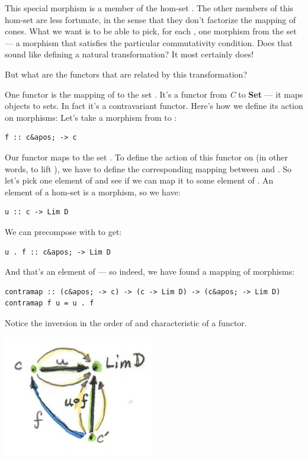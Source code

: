 This special morphism is a member of the hom-set .
The other members of this hom-set are less fortunate, in the sense that
they don't factorize the mapping of cones. What we want is to be able to
pick, for each , one morphism from the set
 --- a morphism that satisfies the particular
commutativity condition. Does that sound like defining a natural
transformation? It most certainly does!

But what are the functors that are related by this transformation?

One functor is the mapping of  to the set
. It's a functor from \emph{C} to \textbf{Set} ---
it maps objects to sets. In fact it's a contravariant functor. Here's
how we define its action on morphisms: Let's take a morphism 
from  to :

\begin{verbatim}
f :: c&apos; -> c
\end{verbatim}

Our functor maps  to the set
. To define the action of this functor on
 (in other words, to lift ), we have to define the
corresponding mapping between  and
. So let's pick one element  of
 and see if we can map it to some element of
. An element of a hom-set is a morphism, so
we have:

\begin{verbatim}
u :: c -> Lim D
\end{verbatim}

We can precompose  with  to get:

\begin{verbatim}
u . f :: c&apos; -> Lim D
\end{verbatim}

And that's an element of --- so indeed, we
have found a mapping of morphisms:

\begin{verbatim}
contramap :: (c&apos; -> c) -> (c -> Lim D) -> (c&apos; -> Lim D) contramap f u = u . f
\end{verbatim}

Notice the inversion in the order of  and 
characteristic of a  functor.

\includegraphics[width=2.59375in]{images/homsetmapping.jpg}

